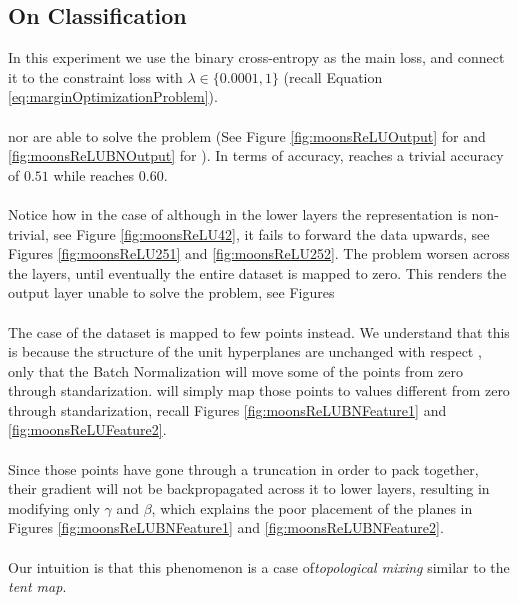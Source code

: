 \subsection{On Classification}\label{subsec:classification}
In this experiment we use the binary cross-entropy as the main loss, and connect it to the constraint loss with $\lambda \in \{0.0001, 1\}$ (recall Equation  \ref{eq:marginOptimizationProblem}).
\\\\
\ReLU nor \ReLUBN are able to solve the problem (See Figure \ref{fig:moonsReLUOutput} for \ReLU and  \ref{fig:moonsReLUBNOutput} for \ReLUBN). In terms of accuracy, \ReLU reaches a trivial accuracy of $0.51$ while \ReLUBN reaches $0.60$. 
\\\\
Notice how in the case of \ReLU although in the lower layers the representation is non-trivial, see Figure \ref{fig:moonsReLU42}, it fails to forward the data upwards, see Figures \ref{fig:moonsReLU251} and \ref{fig:moonsReLU252}. The problem worsen across the layers, until eventually the entire dataset is mapped to zero. This renders the output layer unable to solve the problem, see Figures
\\\\
The case of \ReLUBN the dataset is mapped to few points instead. We understand that this is because the structure of the unit hyperplanes are unchanged with respect \ReLU, only that the Batch Normalization will move some of the points from zero through standarization. \ReLUBN will simply map those points to values different from zero through standarization, recall Figures \ref{fig:moonsReLUBNFeature1} and \ref{fig:moonsReLUFeature2}. 
 \\\\
 Since those points have gone through a truncation in order to pack together, their gradient will not be backpropagated across it to lower layers, resulting in modifying only $\gamma$ and $\beta$, which explains the poor placement of the planes in Figures \ref{fig:moonsReLUBNFeature1} and \ref{fig:moonsReLUBNFeature2}.
 \\\\
 Our intuition is that this phenomenon is a case of\emph{topological mixing}\cite{munkres2000Topology} similar to the \emph{tent map}. 
\\\\
\\\\
